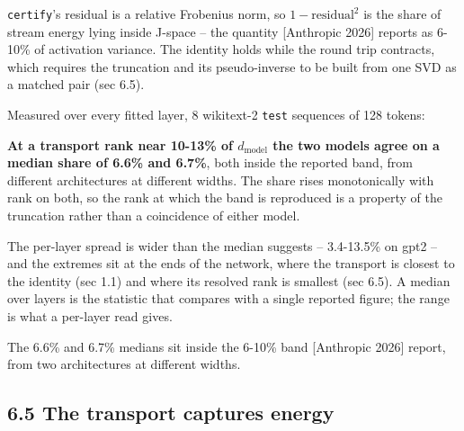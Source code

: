 \documentclass[10pt,letterpaper,twocolumn]{article}
\begin{document}
\texttt{certify}'s residual is a relative Frobenius norm, so \(1-\text{residual}^2\) is the share of stream
energy lying inside J-space -- the quantity {[}Anthropic 2026{]} reports as 6-10\% of activation
variance. The identity holds while the round trip contracts, which requires the truncation and its
pseudo-inverse to be built from one SVD as a matched pair (sec 6.5).

Measured over every fitted layer, 8 wikitext-2 \texttt{test} sequences of 128 tokens:


\textbf{At a transport rank near 10-13\% of \(d_{\text{model}}\) the two models agree on a median share of
6.6\% and 6.7\%}, both inside the reported band, from different architectures at different widths.
The share rises monotonically with rank on both, so the rank at which the band is reproduced is a
property of the truncation rather than a coincidence of either model.

The per-layer spread is wider than the median suggests -- 3.4-13.5\% on gpt2 -- and the extremes sit
at the ends of the network, where the transport is closest to the identity (sec 1.1) and where its
resolved rank is smallest (sec 6.5). A median over layers is the statistic that compares with a
single reported figure; the range is what a per-layer read gives.

The 6.6\% and 6.7\% medians sit inside the 6-10\% band {[}Anthropic 2026{]} report, from two
architectures at different widths.

\subsection{6.5 The transport captures energy}\label{65-the-transport-captures-energy}
\end{document}
